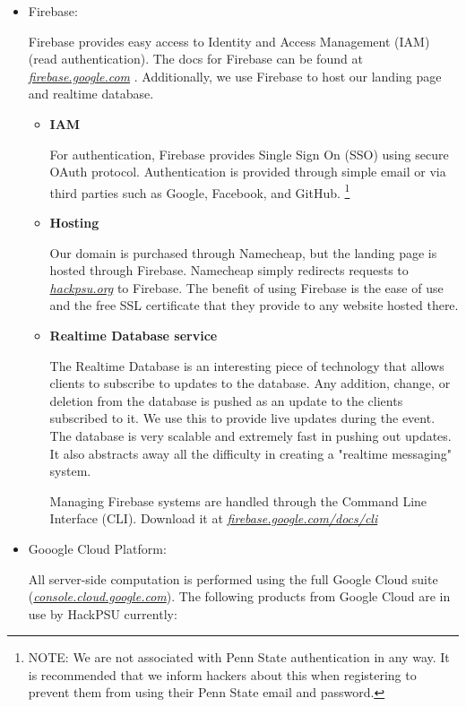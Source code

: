 \documentclass[twoside, 12pt]{article}
\newenvironment{tightitemize} %
{\begin{itemize}\itemsep1pt \parskip0pt \parsep0pt}
{\end{itemize}\vspace{-\topsep}}
\begin{document}
\begin{tightitemize}
    \item Firebase:
    \par Firebase provides easy access to Identity and Access Management (IAM) (read authentication). The docs for Firebase can be found at \href{https://firebase.google.com}{\textit{firebase.google.com}} \cite{google_firebase}. Additionally, we use Firebase to host our landing page and realtime database.
    \begin{itemize}
        \item \textbf{IAM}
        \par For authentication, Firebase provides Single Sign On (SSO) \cite{esplin_2016} using secure OAuth protocol. Authentication is provided through simple email or via third parties such as Google, Facebook, and GitHub. \footnote{NOTE: We are not associated with Penn State authentication in any way. It is recommended that we inform hackers about this when registering to prevent them from using their Penn State email and password.}
        \item \textbf{Hosting}
        \par Our domain is purchased through Namecheap, but the landing page is hosted through Firebase. Namecheap simply redirects requests to \href{https://hackpsu.org}{\textit{hackpsu.org}} to Firebase. The benefit of using Firebase is the ease of use and the free SSL certificate that they provide to any website hosted there.
        \item \textbf{Realtime Database service}
        \par The Realtime Database is an interesting piece of technology that allows clients to subscribe to updates to the database. Any addition, change, or deletion from the database is pushed as an update to the clients subscribed to it. We use this to provide live updates during the event. The database is very scalable and extremely fast in pushing out updates. It also abstracts away all the difficulty in creating a "realtime messaging" system.
    \par Managing Firebase systems are handled through the Command Line Interface (CLI). Download it at \href{https://firebase.google.com/docs/cli/}{\textit{firebase.google.com/docs/cli}}
    \end{itemize}
    \item Gooogle Cloud Platform:
    \par All server-side computation is performed using the full Google Cloud suite (\href{https://console.cloud.google.com}{\textit{console.cloud.google.com}}). The following products from Google Cloud are in use by HackPSU currently:

\end{tightitemize}
\end{document}
